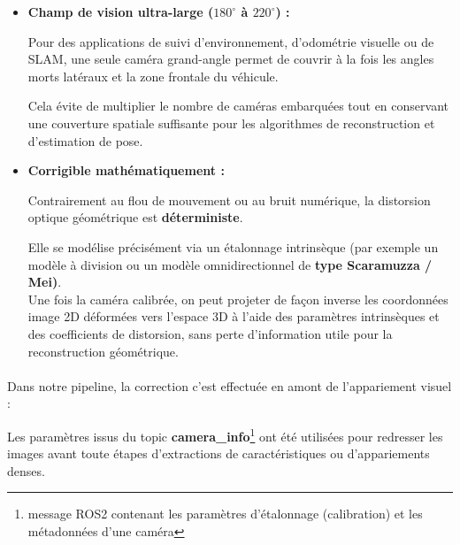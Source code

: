 \documentclass[12pt,a4paper,oneside]{report}
\begin{document}
\begin{itemize}[itemsep=1.5em, label=\textbullet]
    \item \textbf{Champ de vision ultra-large ($180^\circ$ à $220^\circ$) :}\vspace{0.2cm}

    \hspace*{1cm} Pour des applications de suivi d'environnement, d'odométrie visuelle ou de SLAM, une seule caméra grand-angle permet de couvrir à la fois les angles morts latéraux et la zone frontale du véhicule.\vspace{0.05cm}
    
     \hspace{0.5cm}Cela évite de multiplier le nombre de caméras embarquées tout en conservant une couverture spatiale suffisante pour les algorithmes de reconstruction et d'estimation de pose.

    \item \textbf{Corrigible mathématiquement :}\vspace{0.2cm}

    \hspace*{1cm} Contrairement au flou de mouvement ou au bruit numérique, la distorsion optique géométrique est \textbf{déterministe}.\vspace{0.05cm}

    \hspace{0.5cm}Elle se modélise précisément via un étalonnage intrinsèque (par exemple un modèle à division ou un modèle omnidirectionnel de \textbf{type Scaramuzza / Mei)}.\\

    \hspace*{1cm} Une fois la caméra calibrée, on peut projeter de façon inverse les coordonnées image 2D déformées vers l'espace 3D à l'aide des paramètres intrinsèques et des coefficients de distorsion, sans perte d'information utile pour la reconstruction géométrique.
\end{itemize}

\paragraph{}
Dans notre pipeline, la correction c'est effectuée en amont de l'appariement visuel : \vspace{0.01cm}

\hspace*{2cm}Les paramètres issus du topic \textbf{camera\_info}\footnote{message ROS2 contenant les paramètres d'étalonnage (calibration) et les métadonnées d'une caméra} ont été utilisées pour redresser les images avant toute étapes d'extractions de caractéristiques ou d'appariements denses.\\
\end{document}
